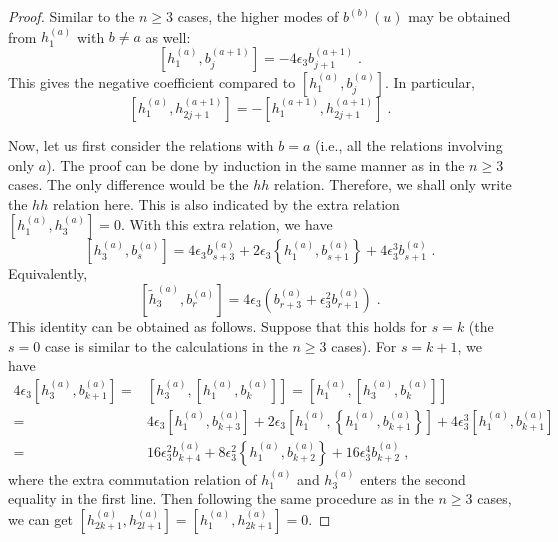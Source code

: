 \documentclass[11pt]{article}
\numberwithin{equation}{section}
\numberwithin{figure}{section}
\numberwithin{table}{section}
\begin{document}
\begin{proof}
	Similar to the $n\geq3$ cases, the higher modes of $b^{(b)}(u)$ may be obtained from $h^{(a)}_1$ with $b\neq a$ as well:
	\begin{equation}
		\left[h^{(a)}_1,b^{(a+1)}_j\right]=-4\epsilon_3b^{(a+1)}_{j+1}\;.
	\end{equation}
	This gives the negative coefficient compared to $\left[h^{(a)}_1,b^{(a)}_j\right]$. In particular,
	\begin{equation}
		\left[h^{(a)}_1,h^{(a+1)}_{2j+1}\right]=-\left[h^{(a+1)}_1,h^{(a+1)}_{2j+1}\right]\;.
	\end{equation}

	Now, let us first consider the relations with $b=a$ (i.e., all the relations involving only $a$). The proof can be done by induction in the same manner as in the $n\geq3$ cases. The only difference would be the $hh$ relation. Therefore, we shall only write the $hh$ relation here. This is also indicated by the extra relation $\left[h^{(a)}_1,h^{(a)}_3\right]=0$. With this extra relation, we have
	\begin{equation}
		\left[h^{(a)}_3,b^{(a)}_s\right]=4\epsilon_3b^{(a)}_{s+3}+2\epsilon_3\left\{h^{(a)}_1,b^{(a)}_{s+1}\right\}+4\epsilon_3^3b^{(a)}_{s+1}\;.
	\end{equation}
	Equivalently,
	\begin{equation}
		\left[\widetilde{h}^{(a)}_3,b^{(a)}_r\right]=4\epsilon_3\left(b^{(a)}_{r+3}+\epsilon_3^2b^{(a)}_{r+1}\right)\;.\label{htildeaban2}
	\end{equation}
	This identity can be obtained as follows. Suppose that this holds for $s=k$ (the $s=0$ case is similar to the calculations in the $n\geq3$ cases). For $s=k+1$, we have
	\begin{align}
		4\epsilon_3\left[h^{(a)}_3,b^{(a)}_{k+1}\right]=&\left[h^{(a)}_3,\left[h^{(a)}_1,b^{(a)}_k\right]\right]=\left[h^{(a)}_1,\left[h^{(a)}_3,b^{(a)}_k\right]\right]\nonumber\\
		=&4\epsilon_3\left[h^{(a)}_1,b^{(a)}_{k+3}\right]+2\epsilon_3\left[h^{(a)}_1,\left\{h^{(a)}_1,b^{(a)}_{k+1}\right\}\right]+4\epsilon_3^3\left[h^{(a)}_1,b^{(a)}_{k+1}\right]\nonumber\\
		=&16\epsilon_3^2b^{(a)}_{k+4}+8\epsilon_3^2\left\{h^{(a)}_1,b^{(a)}_{k+2}\right\}+16\epsilon_3^4b^{(a)}_{k+2}\;,
	\end{align}
	where the extra commutation relation of $h^{(a)}_1$ and $h^{(a)}_3$ enters the second equality in the first line. Then following the same procedure as in the $n\geq3$ cases, we can get $\left[h^{(a)}_{2k+1},h^{(a)}_{2l+1}\right]=\left[h^{(a)}_1,h^{(a)}_{2k+1}\right]=0$.


\end{proof}
\end{document}
